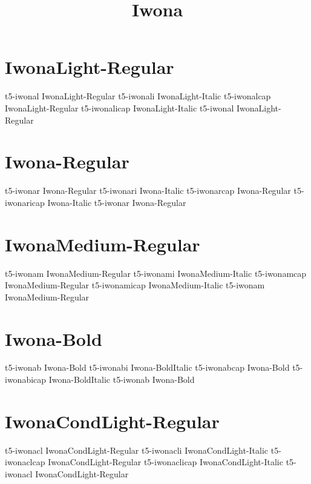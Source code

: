 \documentclass[sample]{vnsample}
\title{Iwona}
\begin{document}
\section{IwonaLight-Regular}
      {t5-iwonal}      {IwonaLight-Regular}
     {t5-iwonali}     {IwonaLight-Italic}
     {t5-iwonalcap}   {IwonaLight-Regular}
   {t5-iwonalicap}  {IwonaLight-Italic}
      {t5-iwonal}      {IwonaLight-Regular}

\section{Iwona-Regular}
      {t5-iwonar}      {Iwona-Regular}
     {t5-iwonari}     {Iwona-Italic}
     {t5-iwonarcap}   {Iwona-Regular}
   {t5-iwonaricap}  {Iwona-Italic}
      {t5-iwonar}      {Iwona-Regular}

\section{IwonaMedium-Regular}
     {t5-iwonam}      {IwonaMedium-Regular}
    {t5-iwonami}     {IwonaMedium-Italic}
    {t5-iwonamcap}   {IwonaMedium-Regular}
  {t5-iwonamicap}  {IwonaMedium-Italic}
     {t5-iwonam}      {IwonaMedium-Regular}

\section{Iwona-Bold}
      {t5-iwonab}      {Iwona-Bold}
     {t5-iwonabi}     {Iwona-BoldItalic}
     {t5-iwonabcap}   {Iwona-Bold}
   {t5-iwonabicap}  {Iwona-BoldItalic}
      {t5-iwonab}      {Iwona-Bold}

\section{IwonaCondLight-Regular}
     {t5-iwonacl}     {IwonaCondLight-Regular}
    {t5-iwonacli}    {IwonaCondLight-Italic}
    {t5-iwonaclcap}  {IwonaCondLight-Regular}
  {t5-iwonaclicap} {IwonaCondLight-Italic}
     {t5-iwonacl}     {IwonaCondLight-Regular}
\end{document}

